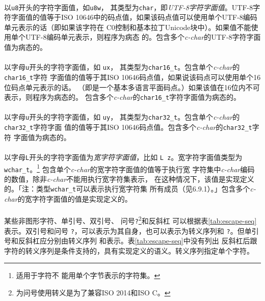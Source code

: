 \paragraph{}
以\texttt{u8}开头的字符字面值，如\texttt{u8\sq{}w\sq}，
其类型为\texttt{char}，即\textit{UTF-8字符字面值}。UTF-8字符字面值的值等于ISO
10646中的码点值，如果该码点值可以使用单个UTF-8编码单元表示的话（即如果该字符在
C0控制和基本拉丁Unicode块中）。如果值不能使用单个UTF-8编码单元表示，则程序为病态
的。包含多个\textit{c-char}的UTF-8字符字面值为病态的。

\paragraph{}
以字母\texttt{u}开头的字符字面值，如
\texttt{u\sq{}x\sq}，
其类型为\texttt{char16\_t}。包含单个\textit{c-char}的\texttt{char16\_t}字符
字面值的值等于其ISO 10646码点值，如果说该码点可以使用单个16位码点单元表示的话。
（即是一个基本多语言平面码点。）如果该值在16位内不可表示，则程序为病态的。
包含多个\textit{c-char}的\texttt{char16\_t}字符字面值为病态的。

\paragraph{}
以字母\texttt{u}开头的字符字面值，如
\texttt{u\sq{}y\sq}，
其类型为\texttt{char32\_t}。包含单个\textit{c-char}的\texttt{char32\_t}字符字面
值的值等于其ISO 10646码点值。包含多个\textit{c-char}的\texttt{char32\_t}字符
字面值为病态的。

\paragraph{}
以字母\texttt{L}开头的字符字面值为\textit{宽字符字面值}，比如
\texttt{L\sq
z\sq}。宽字符字面值类型为\texttt{wchar\_t}。\footnote{适用于字符不
能用单个字节表示的字符集。} 包含单个\textit{c-char}的宽字符字面值的值等于执行宽
字符集中\textit{c-char}编码的数值，除非\textit{c-char}不能用执行宽字符集表示，
在这种情况下，该值是实现定义的。「注：类型\texttt{wchar\_t}可以表示执行宽字符集
所有成员（见6.9.1）。」包含多个\textit{c-char}的宽字符字面值的值是实现定义的。

\paragraph{}
某些非图形字符、单引号\texttt{\sq}、双引号\texttt{\dq}、
问号\texttt{?}\footnote{为问号使用转义是为了兼容ISO 2014和ISO C。}和反斜杠
\texttt{\bs}可以根据表\ref{tab:escape-seq}表示。双引号\texttt{\dq}和问号
\texttt{?}，可以表示为其自身，也可以表示为转义序列\texttt{\bs\dq}和
\texttt{\bs ?}。但单引号\texttt{\sq}和反斜杠\texttt{\bs}应分别由转义序列
\texttt{\bs\sq}和\texttt{\bs\bs}表示。表\ref{tab:escape-seq}中没有列出
反斜杠后跟字符的转义序列是条件支持的，具有实现定义的语义。转义序列指定单个字符。

